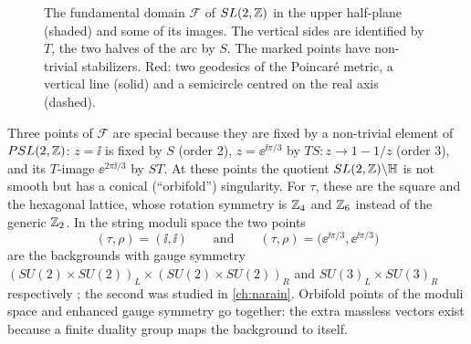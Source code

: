\begin{figure}[t]
\centering
{}
\caption{The fundamental domain $\mathcal F$ of $SL(2,\mathbb{Z})$ in the upper half-plane (shaded) and
some of its images. The vertical sides are identified by $T$, the two halves of the arc by
$S$. The marked points have non-trivial stabilizers. Red: two geodesics of the Poincar\'e
metric, a vertical line (solid) and a semicircle centred on the real axis (dashed).}
\label{fig:torus2:fd}
\end{figure}

Three points of $\mathcal F$ are special because they are fixed by a non-trivial element of
$PSL(2,\mathbb{Z})$: $z=\ii$ is fixed by $S$ (order 2), $z=\ee^{\ii\pi/3}$ by
$TS:z\to1-1/z$ (order 3), and its $T$-image $\ee^{2\pi\ii/3}$ by $ST$. At these points the
quotient $SL(2,\mathbb{Z})\backslash\mathbb H$ is not smooth but has a conical (``orbifold'') singularity.
For $\tau$, these are the square and the hexagonal lattice, whose rotation symmetry is
$\mathbb{Z}_4$ and $\mathbb{Z}_6$ instead of the generic $\mathbb{Z}_2$. In the string moduli space the two points
\begin{equation}\label{eq:torus2:special}
 (\tau,\rho)=(\ii,\ii)\qquad\text{and}\qquad
 (\tau,\rho)=\big(\ee^{\ii\pi/3},\ee^{\ii\pi/3}\big)
\end{equation}
are the backgrounds with gauge symmetry $(SU(2)\times SU(2))_L\times(SU(2)\times SU(2))_R$
and $SU(3)_L\times SU(3)_R$ respectively ; the second was studied in \cref{ch:narain}. Orbifold points of the moduli
space and enhanced gauge symmetry go together: the extra massless vectors exist
because a finite duality group maps the background to itself.

